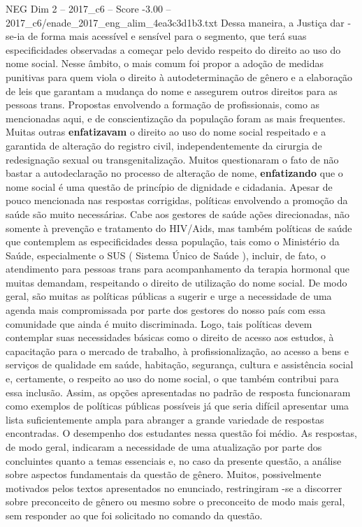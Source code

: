 \begin{textsample}{NEG Dim 2 – 2017\_c6 – Score -3.00 – 2017\_c6/enade\_2017\_eng\_alim\_4ea3c3d1b3.txt}
Dessa maneira, a Justiça dar -se-ia de forma mais acessível e sensível para o segmento, que terá suas especificidades observadas a começar pelo devido respeito do direito ao uso do nome social.
Nesse âmbito, o mais comum foi propor a adoção de medidas punitivas para quem viola o direito à autodeterminação de gênero e a elaboração de leis que garantam a mudança do nome e assegurem outros direitos para as pessoas trans.
Propostas envolvendo a formação de profissionais, como as mencionadas aqui, e de conscientização da população foram as mais frequentes.
Muitas outras \textbf{enfatizavam} o direito ao uso do nome social respeitado e a garantida de alteração do registro civil, independentemente da cirurgia de redesignação sexual ou transgenitalização.
Muitos questionaram o fato de não bastar a autodeclaração no processo de alteração de nome, \textbf{enfatizando} que o nome social é uma questão de princípio de dignidade e cidadania.
Apesar de pouco mencionada nas respostas corrigidas, políticas envolvendo a promoção da saúde são muito necessárias.
Cabe aos gestores de saúde ações direcionadas, não somente à prevenção e tratamento do HIV/Aids, mas também políticas de saúde que contemplem as especificidades dessa população, tais como o Ministério da Saúde, especialmente o SUS ( Sistema Único de Saúde ), incluir, de fato, o atendimento para pessoas trans para acompanhamento da terapia hormonal que muitas demandam, respeitando o direito de utilização do nome social.
De modo geral, são muitas as políticas públicas a sugerir e urge a necessidade de uma agenda mais compromissada por parte dos gestores do nosso país com essa comunidade que ainda é muito discriminada.
Logo, tais políticas devem contemplar suas necessidades básicas como o direito de acesso aos estudos, à capacitação para o mercado de trabalho, à profissionalização, ao acesso a bens e serviços de qualidade em saúde, habitação, segurança, cultura e assistência social e, certamente, o respeito ao uso do nome social, o que também contribui para essa inclusão.
Assim, as opções apresentadas no padrão de resposta funcionaram como exemplos de políticas públicas possíveis já que seria difícil apresentar uma lista suficientemente ampla para abranger a grande variedade de respostas encontradas.
O desempenho dos estudantes nessa questão foi médio.
As respostas, de modo geral, indicaram a necessidade de uma atualização por parte dos concluintes quanto a temas essenciais e, no caso da presente questão, a análise sobre aspectos fundamentais da questão de gênero.
Muitos, possivelmente motivados pelos textos apresentados no enunciado, restringiram -se a discorrer sobre preconceito de gênero ou mesmo sobre o preconceito de modo mais geral, sem responder ao que foi solicitado no comando da questão.

\end{textsample}
